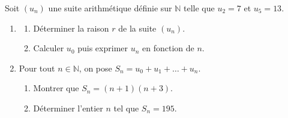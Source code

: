 
\newcommand{\N}{\mathbb{N}}

Soit $(u_n)$ une suite arithmétique définie sur $\N$ telle que $u_2 = 7$ et $u_5 = 13$.

\begin{enumerate}
  \item
  \begin{enumerate}
    \item Déterminer la raison $r$ de la suite $(u_n)$.
    \item Calculer $u_0$ puis exprimer $u_n$ en fonction de $n$.
  \end{enumerate}
  \item Pour tout $n \in \N$, on pose $S_n = u_0 + u_1 + \dots + u_n$.
  \begin{enumerate}
    \item Montrer que $S_n = (n+1)(n+3)$.
    \item Déterminer l'entier $n$ tel que $S_n = 195$.
  \end{enumerate}
\end{enumerate}

